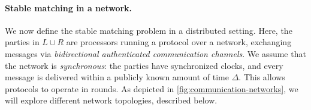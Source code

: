 \paragraph{Stable matching in a network.}
We now define the stable matching problem in a distributed setting. Here, the parties in $L \cup R$ are processors running a protocol over a network, exchanging messages via \emph{bidirectional authenticated communication channels}.
We assume that the network is \emph{synchronous}: the parties have synchronized clocks, and every message is delivered within a publicly known amount of time $\Delta$. This 
allows protocols to operate in rounds. As depicted in \cref{fig:communication-networks}, we will explore different network topologies, described below.


